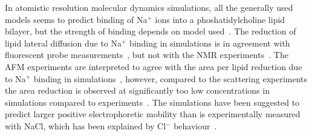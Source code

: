 \documentclass[pre,aps,floatfix,authordate1-4,twocolumn]{revtex4-1}
\begin{document}

In atomistic resolution molecular dynamics simulations, all the generally used models seems
to predict binding of Na${^+}$ ions into a phoshatidylcholine lipid bilayer, 
but the strength of binding depends on model used~\cite{bockmann03,bockmann04,sachs04,berkowitz06,cordomi09,valley11,berkowitz12}. 
The reduction of lipid lateral diffusion due to Na$^+$ binding in simulations is in agreement with 
fluorescent probe measurements~\cite{bockmann03,vacha09a,harb13}, but not with the NMR experiments~\cite{filippov09}.
The AFM experiments are interpreted to agree with the area per lipid reduction due to Na$^+$ binding
in simulations~\cite{manyes05,manyes06,fukuma07,ferber11,morata12}, however, compared to the scattering experiments the area reduction 
is observed at significantly too low concentrations in simulations compared to experiments~\cite{pabst07}.
The simulations have been suggested to predict larger positive electrophoretic mobility than is experimentally
measured with NaCl, which has been explained by Cl$^-$ behaviour~\cite{berkowitz06,knecht13}.


\end{document}

